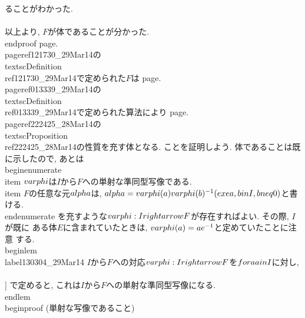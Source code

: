  ることがわかった.\\\\
  以上より, $F$が体であることが分かった.
 \\end{proof}
  page.\\pageref{121730_29Mar14}の\\textsc{Definition}~\\ref{121730_29Mar14}で定められた$F$は
  page.\\pageref{013339_29Mar14}の\\textsc{Definition}~\\ref{013339_29Mar14}で定められた算法により
  page.\\pageref{222425_28Mar14}の\\textsc{Proposition}~\\ref{222425_28Mar14}の性質を充す体となる.
  ことを証明しよう.
 体であることは既に示したので, あとは
  \\begin{enumerate}
   \\item $\\varphi$は$I$から$F$への単射な準同型写像である.
   \\item $F$の任意な元$\\alpha$は, $\\alpha=\\varphi(a)\\varphi(b)^{-1}(\\exe
         a,b\\in I,b\\neq 0)$と書ける.
  \\end{enumerate}
を充すような$\\varphi:I\\rightarrow F$が存在すればよい. その際, $I$が既に
ある体$E$に含まれていたときは, $\\varphi(a)=ae^{-1}$と定めていたことに注意
する.
\\begin{lem}
 \\label{130304_29Mar14}
 $I$から$F$への対応$\\varphi:I\\rightarrow F$を$\\fora a\\in I$に対し,
 \\[
 \\varphi(a)=[a,e]
 \\]
 で定めると, これは$I$から$F$への単射な準同型写像になる.
\\end{lem}
 \\begin{proof}
  (単射な写像であること)\\\\
